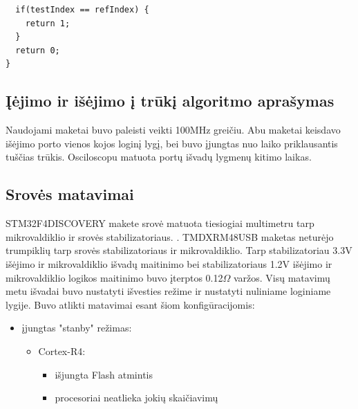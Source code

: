 \documentclass[a4paper, 12pt]{article} %
\begin{document}
\begin{onehalfspacing}
\begin{verbatim}
  if(testIndex == refIndex) { 
    return 1;
  } 
  return 0;
}
\end{verbatim}
\subsection{\k{I}\.ejimo ir i\v{s}\.ejimo \k{i} tr\=uk\k{i} algoritmo apra\v{s}ymas}
Naudojami maketai buvo paleisti veikti 100MHz grei\v{c}iu. Abu maketai keisdavo i\v{s}\.ejimo porto vienos kojos login\k{i} lyg\k{i}, bei buvo \k{i}jungtas nuo laiko priklausantis tu\v{s}\v{c}ias tr\=ukis. Osciloscopu matuota port\k{u} i\v{s}vad\k{u} lygmen\k{u} kitimo laikas.
\subsection{Srov\.es matavimai}
STM32F4DISCOVERY makete srov\.e matuota tiesiogiai multimetru 
tarp mikrovaldiklio ir srov\.es stabilizatoriaus. . TMDXRM48USB maketas netur\.ejo 
trumpikli\k{u} tarp srov\.es stabilizatoriaus ir mikrovaldiklio. Tarp stabilizatoriau 3.3V i\v{s}\.ejimo ir mikrovaldiklio i\v{s}vad\k{u} maitinimo bei stabilizatoriaus 1.2V i\v{s}\.ejimo ir mikrovaldiklio logikos maitinimo buvo \k{i}terptos 0.12$\Omega$ var\v{z}os. Vis\k{u} matavim\k{u} metu 
  i\v{s}vadai buvo nustatyti i\v{s}vesties re\v{z}ime ir 
  nustatyti nuliniame loginiame lygije. Buvo atlikti matavimai
  esant \v{s}iom konfig\={u}racijomis:
\begin{itemize}
\item \k{i}jungtas "stanby" re\v{z}imas:
\begin{itemize} 
\item Cortex-R4:
\begin{itemize}
\item i\v{s}jungta Flash atmintis
\item procesoriai neatlieka joki\k{u} skai\v{c}iavim\k{u}
\end{itemize}


\end{itemize}
\end{itemize}
\end{onehalfspacing}
\end{document}
